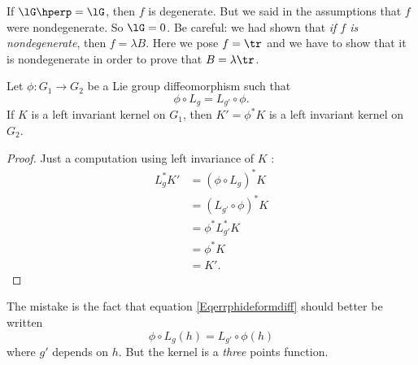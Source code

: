 \begin{erreur}\label{err:f_dege}
If $\lG\hperp=\lG$, then $f$ is degenerate. But we said in the assumptions that $f$ were nondegenerate. So $\lG=0$. Be careful: we had shown that \emph{if $f$ is nondegenerate}, then $f=\lambda B$. Here we pose $f=\tr$ and we have to show that it is nondegenerate in order to prove that $B=\lambda\tr$.
\end{erreur}

\begin{erreur}
\begin{proposition}  \label{ProperrProdInvarDiffeo}
Let $\phi\colon G_{1}\to G_{2}$ be a Lie group diffeomorphism such that
\begin{equation} \label{Eqerrphideformdiff}
  \phi\circ L_{g}=L_{g'}\circ\phi.
\end{equation}
If $K$ is a left invariant kernel on $G_{1}$, then $K'=\phi^*K$ is a left invariant kernel on $G_{2}$.
\end{proposition}

\begin{proof}
Just a computation using left invariance of $K$ :
\[ 
\begin{split}
  L_{g}^*K'&=(\phi\circ L_{g})^*K\\
		&=(L_{g'}\circ\phi)^*K\\
		&=\phi^*L_{g'}^*K\\
		&=\phi^*K\\
		&=K'.
\end{split}  
\]

\end{proof}

The mistake is the fact that equation \eqref{Eqerrphideformdiff} should better be written
\[ 
  \phi\circ L_{g}(h)=L_{g'}\circ\phi(h)
\]
where $g'$ depends on $h$.  But the kernel is a \emph{three} points function. 

\end{erreur}
